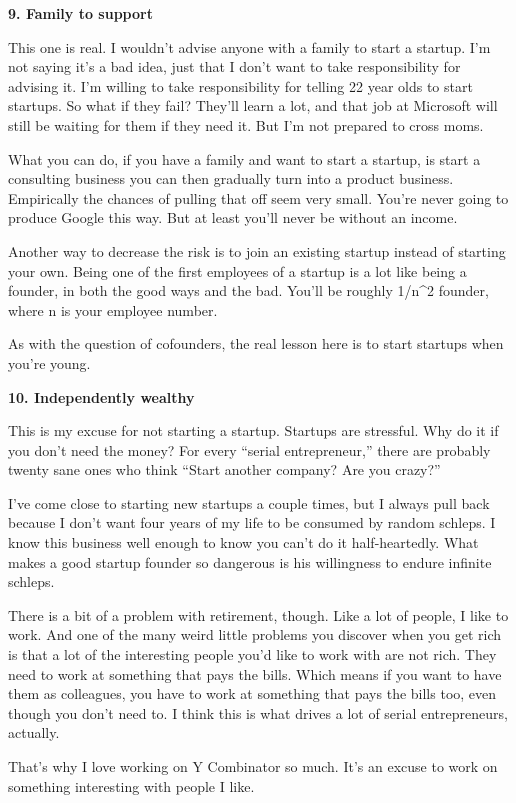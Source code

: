 \documentclass[12pt]{book}
\begin{document}
\textbf{9. Family to support}

This one is real. I wouldn't advise anyone with a family to start a
startup. I'm not saying it's a bad idea, just that I don't want to take
responsibility for advising it. I'm willing to take responsibility for
telling 22 year olds to start startups. So what if they fail? They'll
learn a lot, and that job at Microsoft will still be waiting for them if
they need it. But I'm not prepared to cross moms.

What you can do, if you have a family and want to start a startup, is
start a consulting business you can then gradually turn into a product
business. Empirically the chances of pulling that off seem very small.
You're never going to produce Google this way. But at least you'll never
be without an income.

Another way to decrease the risk is to join an existing startup instead
of starting your own. Being one of the first employees of a startup is a
lot like being a founder, in both the good ways and the bad. You'll be
roughly 1/n\^{}2 founder, where n is your employee number.

As with the question of cofounders, the real lesson here is to start
startups when you're young.

\textbf{10. Independently wealthy}

This is my excuse for not starting a startup. Startups are stressful.
Why do it if you don't need the money? For every ``serial
entrepreneur,'' there are probably twenty sane ones who think ``Start
another company? Are you crazy?''

I've come close to starting new startups a couple times, but I always
pull back because I don't want four years of my life to be consumed by
random schleps. I know this business well enough to know you can't do it
half-heartedly. What makes a good startup founder so dangerous is his
willingness to endure infinite schleps.

There is a bit of a problem with retirement, though. Like a lot of
people, I like to work. And one of the many weird little problems you
discover when you get rich is that a lot of the interesting people you'd
like to work with are not rich. They need to work at something that pays
the bills. Which means if you want to have them as colleagues, you have
to work at something that pays the bills too, even though you don't need
to. I think this is what drives a lot of serial entrepreneurs, actually.

That's why I love working on Y Combinator so much. It's an excuse to
work on something interesting with people I like.
\end{document}
